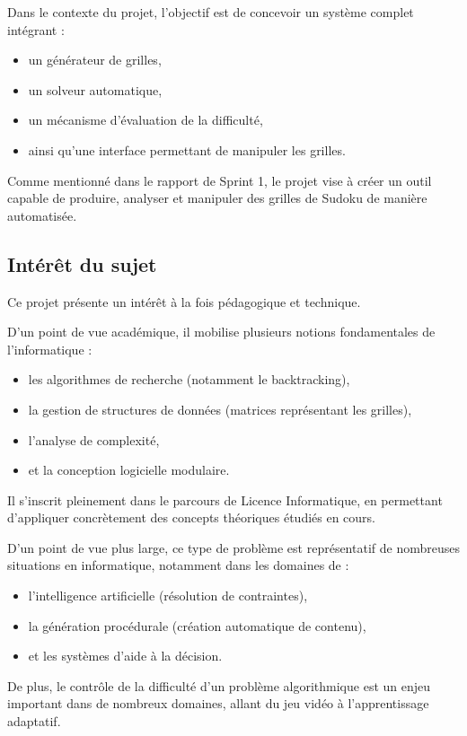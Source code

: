 \documentclass[a4paper]{article}
\begin{document}
Dans le contexte du projet, l’objectif est de concevoir un système complet intégrant :
\begin{itemize}
    \item un générateur de grilles,
    \item un solveur automatique,
    \item un mécanisme d’évaluation de la difficulté,
    \item ainsi qu’une interface permettant de manipuler les grilles.
\end{itemize}

Comme mentionné dans le rapport de Sprint 1, le projet vise à créer un outil capable de produire, analyser et manipuler des grilles de Sudoku de manière automatisée.

\subsection{Intérêt du sujet}

Ce projet présente un intérêt à la fois pédagogique et technique.

D’un point de vue académique, il mobilise plusieurs notions fondamentales de l’informatique :
\begin{itemize}
    \item les algorithmes de recherche (notamment le backtracking),
    \item la gestion de structures de données (matrices représentant les grilles),
    \item l’analyse de complexité,
    \item et la conception logicielle modulaire.
\end{itemize}

Il s’inscrit pleinement dans le parcours de Licence Informatique, en permettant d’appliquer concrètement des concepts théoriques étudiés en cours.

D’un point de vue plus large, ce type de problème est représentatif de nombreuses situations en informatique, notamment dans les domaines de :
\begin{itemize}
    \item l’intelligence artificielle (résolution de contraintes),
    \item la génération procédurale (création automatique de contenu),
    \item et les systèmes d’aide à la décision.
\end{itemize}

De plus, le contrôle de la difficulté d’un problème algorithmique est un enjeu important dans de nombreux domaines, allant du jeu vidéo à l’apprentissage adaptatif.
\end{document}
